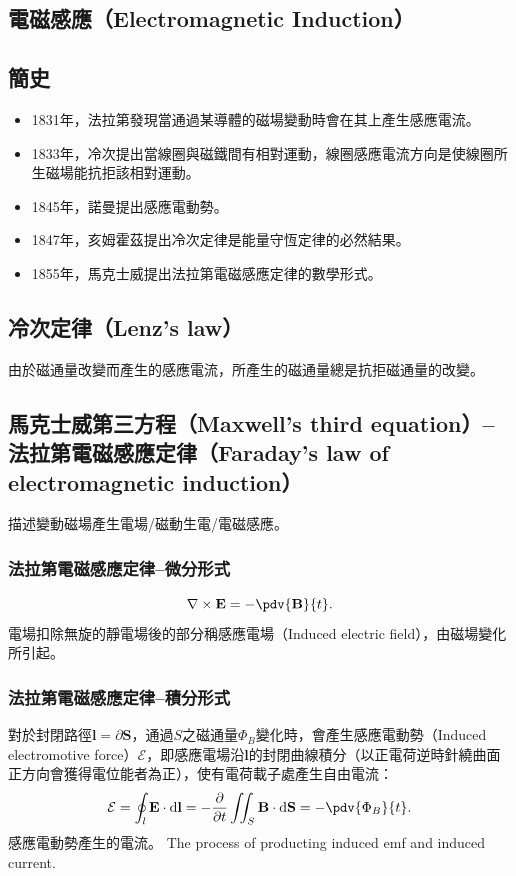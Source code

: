 \documentclass[a4paper,12pt]{report}
\begin{document}
\begin{itemize}
\section{電磁感應（Electromagnetic Induction）}
\subsection{簡史}
\begin{itemize}
\item 1831年，法拉第發現當通過某導體的磁場變動時會在其上產生感應電流。
\item 1833年，冷次提出當線圈與磁鐵間有相對運動，線圈感應電流方向是使線圈所生磁場能抗拒該相對運動。
\item 1845年，諾曼提出感應電動勢。
\item 1847年，亥姆霍茲提出冷次定律是能量守恆定律的必然結果。
\item 1855年，馬克士威提出法拉第電磁感應定律的數學形式。
\end{itemize}
\subsection{冷次定律（Lenz's law）}
由於磁通量改變而產生的感應電流，所產生的磁通量總是抗拒磁通量的改變。
\subsection{馬克士威第三方程（Maxwell's third equation）–法拉第電磁感應定律（Faraday's law of electromagnetic induction）}
描述變動磁場產生電場/磁動生電/電磁感應。
\subsubsection{法拉第電磁感應定律–微分形式}
\[\nabla \times \mathbf{E} = -\pdv{\mathbf{B}}{t}.\]
電場扣除無旋的靜電場後的部分稱感應電場（Induced electric field），由磁場變化所引起。
\subsubsection{法拉第電磁感應定律–積分形式}
對於封閉路徑$\mathbf{l}=\partial\mathbf{S}$，通過$S$之磁通量$\Phi_B$變化時，會產生感應電動勢（Induced electromotive force）$\mathcal{E}$，即感應電場沿$\mathbf{l}$的封閉曲線積分（以正電荷逆時針繞曲面正方向會獲得電位能者為正），使有電荷載子處產生自由電流：
\[\mathcal{E}=\oint_{l}\mathbf{E}\cdot\mathrm{d}\mathbf{l}=-\frac{\partial}{\partial t}\iint_S\mathbf{B}\cdot\mathrm{d}\mathbf{S}=-\pdv{\Phi_B}{t}.\]
感應電動勢產生的電流。
The process of producting induced emf and induced current.

\end{itemize}
\end{document}
